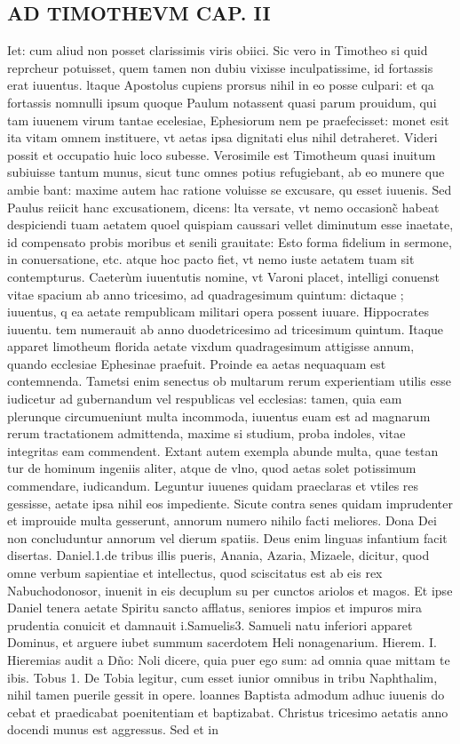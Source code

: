 \documentclass{article}
\begin{document}
\begin{pages}
\section*{AD TIMOTHEVM CAP. II }
\marginpar{[ p.100 ]}\pstart Iet: cum aliud non posset clarissimis viris obiici. Sic vero in Timotheo si quid reprcheur potuisset, quem tamen non dubiu vixisse inculpatissime, id fortassis erat iuuentus. ltaque Apostolus cupiens prorsus nihil in eo posse culpari: et qa fortassis nomnulli ipsum quoque  Paulum notassent quasi parum prouidum, qui tam iuuenem virum tantae ecelesiae, Ephesiorum nem pe praefecisset: monet esit ita vitam omnem instituere, vt aetas ipsa dignitati elus nihil detraheret. Videri possit et occupatio huic loco subesse. Verosimile est Timotheum quasi inuitum subiuisse tantum munus, sicut tunc omnes potius refugiebant, ab eo munere que ambie bant: maxime autem hac ratione voluisse se excusare, qu esset iuuenis. Sed Paulus reiicit hanc excusationem, dicens: lta versate, vt nemo occasionc̃ habeat despiciendi tuam aetatem quoel quispiam caussari vellet diminutum esse inaetate, id compensato probis moribus et senili grauitate: Esto forma fidelium in sermone, in conuersatione, etc. atque hoc pacto fiet, vt nemo iuste aetatem tuam sit contempturus. Caeterùm iuuentutis nomine, vt Varoni placet, intelligi conuenst vitae spacium ab anno tricesimo, ad quadragesimum quintum: dictaque ; iuuentus, q ea aetate rempublicam militari opera possent iuuare. Hippocrates iuuentu. tem numerauit ab anno duodetricesimo ad tricesimum quintum. Itaque apparet limotheum florida aetate vixdum quadragesimum attigisse annum, quando ecclesiae Ephesinae praefuit. Proinde ea aetas nequaquam est contemnenda. Tametsi enim senectus ob multarum rerum experientiam utilis esse iudicetur ad gubernandum vel respublicas vel ecclesias: tamen, quia eam plerunque circumueniunt multa incommoda, iuuentus euam est ad magnarum rerum tractationem admittenda, maxime si studium, proba indoles, vitae integritas eam commendent. Extant autem exempla abunde multa, quae testan tur de hominum ingeniis aliter, atque de vlno, quod aetas solet potissimum commendare, iudicandum. Leguntur iuuenes quidam praeclaras et vtiles res gessisse, aetate ipsa nihil eos impediente. Sicute contra senes quidam imprudenter et improuide multa gesserunt, annorum numero nihilo facti meliores. Dona Dei non concluduntur annorum vel dierum spatiis. Deus enim linguas infantium facit disertas. Daniel.1.de tribus illis pueris, Anania, Azaria, Mizaele, dicitur, quod omne verbum sapientiae et intellectus, quod sciscitatus est ab eis rex Nabuchodonosor, inuenit in eis decuplum su per cunctos ariolos et magos. Et ipse Daniel tenera aetate Spiritu sancto afflatus, seniores impios et impuros mira prudentia conuicit et damnauit i.Samuelis3. Samueli natu inferiori apparet Dominus, et arguere iubet summum sacerdotem Heli nonagenarium. Hierem. I. Hieremias audit a Dño: Noli dicere, quia puer ego sum: ad omnia quae mittam te ibis. Tobus 1. De Tobia legitur, cum esset iunior omnibus in tribu Naphthalim, nihil tamen puerile gessit in opere. loannes Baptista admodum adhuc iuuenis do cebat et praedicabat poenitentiam et baptizabat. Christus tricesimo aetatis anno docendi munus est aggressus. Sed et in 
\end{pages}
\end{document}
